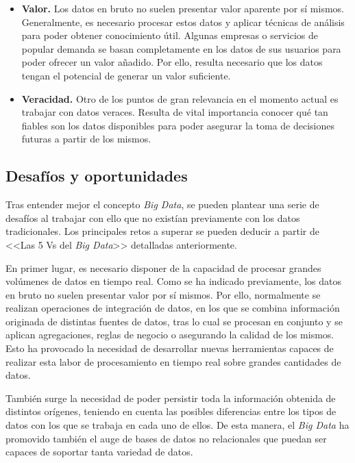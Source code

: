 \begin{itemize}
    \item \textbf{Valor.} Los datos en bruto no suelen presentar valor aparente por sí mismos. Generalmente, es necesario procesar estos datos y aplicar técnicas de análisis para poder obtener conocimiento útil. Algunas empresas o servicios de popular demanda se basan completamente en los datos de sus usuarios para poder ofrecer un valor añadido. Por ello, resulta necesario que los datos tengan el potencial de generar un valor suficiente. 
    
    \item \textbf{Veracidad.} Otro de los puntos de gran relevancia en el momento actual es trabajar con datos veraces. Resulta de vital importancia conocer qué tan fiables son los datos disponibles para poder asegurar la toma de decisiones futuras a partir de los mismos.
\end{itemize}

\subsection{Desafíos y oportunidades}

Tras entender mejor el concepto \textit{Big Data}, se pueden plantear una serie de desafíos al trabajar con ello que no existían previamente con los datos tradicionales. Los principales retos a superar se pueden deducir a partir de <<Las 5 Vs del \textit{Big Data}>> detalladas anteriormente.

En primer lugar, es necesario disponer de la capacidad de procesar grandes volúmenes de datos en tiempo real. Como se ha indicado previamente, los datos en bruto no suelen presentar valor por sí mismos. Por ello, normalmente se realizan operaciones de integración de datos, en los que se combina información originada de distintas fuentes de datos, tras lo cual se procesan en conjunto y se aplican agregaciones, reglas de negocio o asegurando la calidad de los mismos. Esto ha provocado la necesidad de desarrollar nuevas herramientas capaces de realizar esta labor de procesamiento en tiempo real sobre grandes cantidades de datos.

También surge la necesidad de poder persistir toda la información obtenida de distintos orígenes, teniendo en cuenta las posibles diferencias entre los tipos de datos con los que se trabaja en cada uno de ellos. De esta manera, el \textit{Big Data} ha promovido también el auge de bases de datos no relacionales que puedan ser capaces de soportar tanta variedad de datos.

